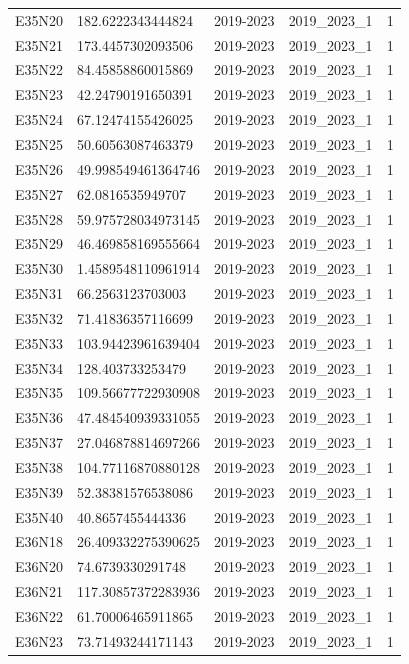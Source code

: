 \begin{landscape}
\begin{longtable}{lllll}
E35N20 & 182.6222343444824 & 2019-2023 & 2019\_2023\_1 & 1 \\
E35N21 & 173.4457302093506 & 2019-2023 & 2019\_2023\_1 & 1 \\
E35N22 & 84.45858860015869 & 2019-2023 & 2019\_2023\_1 & 1 \\
E35N23 & 42.24790191650391 & 2019-2023 & 2019\_2023\_1 & 1 \\
E35N24 & 67.12474155426025 & 2019-2023 & 2019\_2023\_1 & 1 \\
E35N25 & 50.60563087463379 & 2019-2023 & 2019\_2023\_1 & 1 \\
E35N26 & 49.998549461364746 & 2019-2023 & 2019\_2023\_1 & 1 \\
E35N27 & 62.0816535949707 & 2019-2023 & 2019\_2023\_1 & 1 \\
E35N28 & 59.975728034973145 & 2019-2023 & 2019\_2023\_1 & 1 \\
E35N29 & 46.469858169555664 & 2019-2023 & 2019\_2023\_1 & 1 \\
E35N30 & 1.4589548110961914 & 2019-2023 & 2019\_2023\_1 & 1 \\
E35N31 & 66.2563123703003 & 2019-2023 & 2019\_2023\_1 & 1 \\
E35N32 & 71.41836357116699 & 2019-2023 & 2019\_2023\_1 & 1 \\
E35N33 & 103.94423961639404 & 2019-2023 & 2019\_2023\_1 & 1 \\
E35N34 & 128.403733253479 & 2019-2023 & 2019\_2023\_1 & 1 \\
E35N35 & 109.56677722930908 & 2019-2023 & 2019\_2023\_1 & 1 \\
E35N36 & 47.484540939331055 & 2019-2023 & 2019\_2023\_1 & 1 \\
E35N37 & 27.046878814697266 & 2019-2023 & 2019\_2023\_1 & 1 \\
E35N38 & 104.77116870880128 & 2019-2023 & 2019\_2023\_1 & 1 \\
E35N39 & 52.38381576538086 & 2019-2023 & 2019\_2023\_1 & 1 \\
E35N40 & 40.8657455444336 & 2019-2023 & 2019\_2023\_1 & 1 \\
E36N18 & 26.409332275390625 & 2019-2023 & 2019\_2023\_1 & 1 \\
E36N20 & 74.6739330291748 & 2019-2023 & 2019\_2023\_1 & 1 \\
E36N21 & 117.30857372283936 & 2019-2023 & 2019\_2023\_1 & 1 \\
E36N22 & 61.70006465911865 & 2019-2023 & 2019\_2023\_1 & 1 \\
E36N23 & 73.71493244171143 & 2019-2023 & 2019\_2023\_1 & 1 \\

\end{longtable}
\end{landscape}
